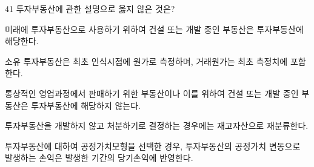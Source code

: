 \begin{question}{41}
투자부동산에 관한 설명으로 옳지 않은 것은?
\begin{choices}
  \item 미래에 투자부동산으로 사용하기 위하여 건설 또는 개발 중인 부동산은 투자부동산에 해당한다.
  \item 소유 투자부동산은 최초 인식시점에 원가로 측정하며, 거래원가는 최초 측정치에 포함한다.
  \item 통상적인 영업과정에서 판매하기 위한 부동산이나 이를 위하여 건설 또는 개발 중인 부동산은 투자부동산에 해당하지 않는다.
  \item 투자부동산을 개발하지 않고 처분하기로 결정하는 경우에는 재고자산으로 재분류한다.
  \item 투자부동산에 대하여 공정가치모형을 선택한 경우, 투자부동산의 공정가치 변동으로 발생하는 손익은 발생한 기간의 당기손익에 반영한다.
\end{choices}
\end{question}
